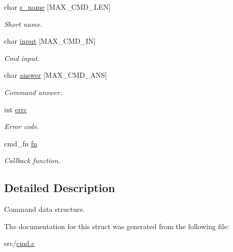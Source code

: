 \begin{DoxyCompactItemize}
char \hyperlink{struct__Cmd_ac7a8c09e258cb2b2f63d179943616d08}{s\+\_\+name} \mbox{[}M\+A\+X\+\_\+\+C\+M\+D\+\_\+\+L\+EN\mbox{]}
\begin{DoxyCompactList}\small\item\em Short name. \end{DoxyCompactList}\item 
\mbox{\label{struct__Cmd_a3d023ded28ab2b9ec8daae3ebf1a3759}} 
char \hyperlink{struct__Cmd_a3d023ded28ab2b9ec8daae3ebf1a3759}{input} \mbox{[}M\+A\+X\+\_\+\+C\+M\+D\+\_\+\+IN\mbox{]}
\begin{DoxyCompactList}\small\item\em Cmd input. \end{DoxyCompactList}\item 
\mbox{\label{struct__Cmd_a143c62700ed611e1ff0d70611c76fa55}} 
char \hyperlink{struct__Cmd_a143c62700ed611e1ff0d70611c76fa55}{answer} \mbox{[}M\+A\+X\+\_\+\+C\+M\+D\+\_\+\+A\+NS\mbox{]}
\begin{DoxyCompactList}\small\item\em Command answer. \end{DoxyCompactList}\item 
\mbox{\label{struct__Cmd_a4f3acf8cfdc67548121c1989765cbbcf}} 
int \hyperlink{struct__Cmd_a4f3acf8cfdc67548121c1989765cbbcf}{errc}
\begin{DoxyCompactList}\small\item\em Error code. \end{DoxyCompactList}\item 
\mbox{\label{struct__Cmd_abfca5a0889206135702ed3e398079bad}} 
cmd\+\_\+fn \hyperlink{struct__Cmd_abfca5a0889206135702ed3e398079bad}{fn}
\begin{DoxyCompactList}\small\item\em Callback function. \end{DoxyCompactList}\end{DoxyCompactItemize}


\subsection{Detailed Description}
Command data structure. 

The documentation for this struct was generated from the following file\+:\begin{DoxyCompactItemize}
\item 
src/\hyperlink{cmd_8c}{cmd.\+c}\end{DoxyCompactItemize}
